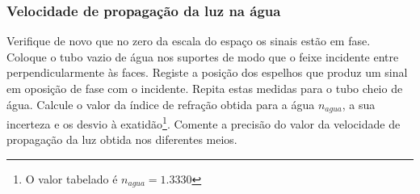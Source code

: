 \documentclass[a4paper,12pt]{article}      %
\begin{document}
\subsubsection{\sf Velocidade de propagação da luz na água}
Verifique de novo que no zero da escala do espaço os sinais estão em fase. Coloque o tubo vazio de 
água nos suportes de modo que o feixe incidente entre perpendicularmente às faces.
Registe a posição dos espelhos que produz um sinal em oposição de fase com o incidente. 
Repita estas medidas para o tubo cheio de água. 
Calcule o valor da índice de refração obtida para a água $n_{agua}$, a sua incerteza e os desvio à exatidão\footnote{O valor tabelado é $n_{agua}=1.3330$}. 
Comente a precisão do valor da velocidade de propagação da luz obtida nos 
diferentes meios.
\end{document}
